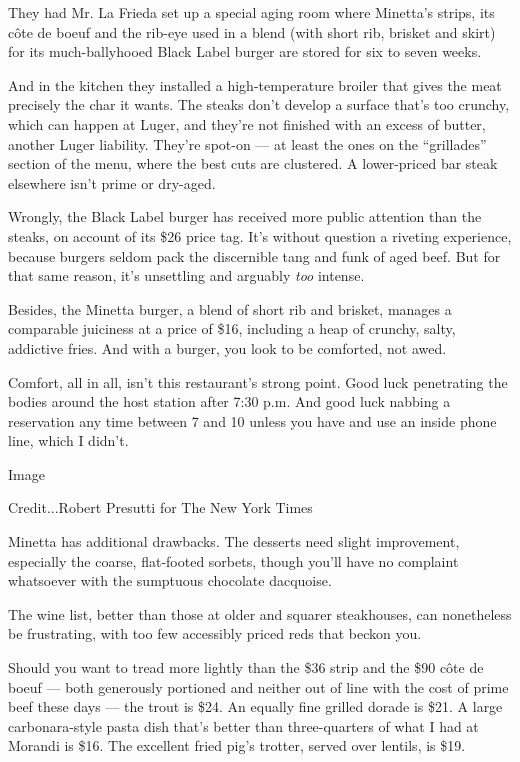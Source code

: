 They had Mr. La Frieda set up a special aging room where Minetta's
strips, its côte de boeuf and the rib-eye used in a blend (with short
rib, brisket and skirt) for its much-ballyhooed Black Label burger are
stored for six to seven weeks.

And in the kitchen they installed a high-temperature broiler that gives
the meat precisely the char it wants. The steaks don't develop a surface
that's too crunchy, which can happen at Luger, and they're not finished
with an excess of butter, another Luger liability. They're spot-on ---
at least the ones on the ``grillades'' section of the menu, where the
best cuts are clustered. A lower-priced bar steak elsewhere isn't prime
or dry-aged.

Wrongly, the Black Label burger has received more public attention than
the steaks, on account of its \$26 price tag. It's without question a
riveting experience, because burgers seldom pack the discernible tang
and funk of aged beef. But for that same reason, it's unsettling and
arguably \emph{too} intense.

Besides, the Minetta burger, a blend of short rib and brisket, manages a
comparable juiciness at a price of \$16, including a heap of crunchy,
salty, addictive fries. And with a burger, you look to be comforted, not
awed.

Comfort, all in all, isn't this restaurant's strong point. Good luck
penetrating the bodies around the host station after 7:30 p.m. And good
luck nabbing a reservation any time between 7 and 10 unless you have and
use an inside phone line, which I didn't.

Image

Credit...Robert Presutti for The New York Times

Minetta has additional drawbacks. The desserts need slight improvement,
especially the coarse, flat-footed sorbets, though you'll have no
complaint whatsoever with the sumptuous chocolate dacquoise.

The wine list, better than those at older and squarer steakhouses, can
nonetheless be frustrating, with too few accessibly priced reds that
beckon you.

Should you want to tread more lightly than the \$36 strip and the \$90
côte de boeuf --- both generously portioned and neither out of line with
the cost of prime beef these days --- the trout is \$24. An equally fine
grilled dorade is \$21. A large carbonara-style pasta dish that's better
than three-quarters of what I had at Morandi is \$16. The excellent
fried pig's trotter, served over lentils, is \$19.

